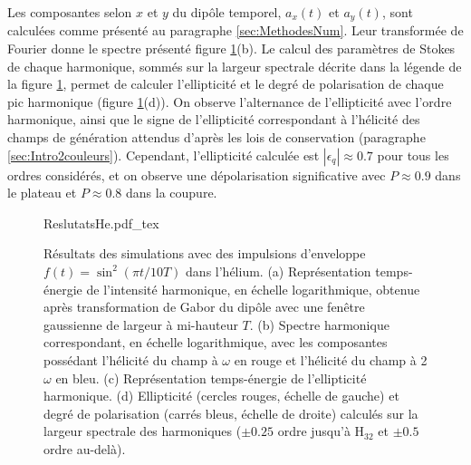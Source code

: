 Les composantes selon $x$ et $y$ du dipôle temporel, $a_x (t)$ et $a_y(t)$, sont calculées comme présenté au paragraphe \ref{sec:MethodesNum}. Leur transformée de Fourier donne le spectre présenté figure \ref{fig:ResultatsHe}(b). Le calcul des paramètres de Stokes de chaque harmonique, sommés sur la largeur spectrale décrite dans la légende de la figure \ref{fig:ResultatsHe}, permet de calculer l'ellipticité et le degré de polarisation de chaque pic harmonique (figure \ref{fig:ResultatsHe}(d)). On observe l'alternance de l'ellipticité avec l'ordre harmonique, ainsi que le signe de l'ellipticité correspondant à l'hélicité des champs de génération attendus d'après les lois de conservation (paragraphe \ref{sec:Intro2couleurs}). Cependant, l'ellipticité calculée est $|\epsilon_q| \approx 0.7$ pour tous les ordres considérés, et on observe une dépolarisation significative avec $P \approx 0.9$ dans le plateau et $P \approx 0.8$ dans la coupure.

\begin{figure}
\centering
\def\svgwidth{\textwidth}
{ReslutatsHe.pdf_tex}
\caption{Résultats des simulations avec des impulsions d'enveloppe $f(t) = \sin^2 (\pi t / 10 T)$ dans l'hélium. (a) Représentation temps-énergie de l'intensité harmonique, en échelle logarithmique, obtenue après transformation de Gabor du dipôle avec une fenêtre gaussienne de largeur à mi-hauteur $T$. (b) Spectre harmonique correspondant, en échelle logarithmique, avec les composantes possédant l'hélicité du champ à $\omega$ en rouge et l'hélicité du champ à 2$\omega$ en bleu. (c) Représentation temps-énergie de l'ellipticité harmonique. (d) Ellipticité (cercles rouges, échelle de gauche) et degré de polarisation (carrés bleus, échelle de droite) calculés sur la largeur spectrale des harmoniques ($\pm 0.25$ ordre jusqu'à H$_{32}$ et $\pm 0.5$ ordre au-delà).}
\label{fig:ResultatsHe}
\end{figure}


